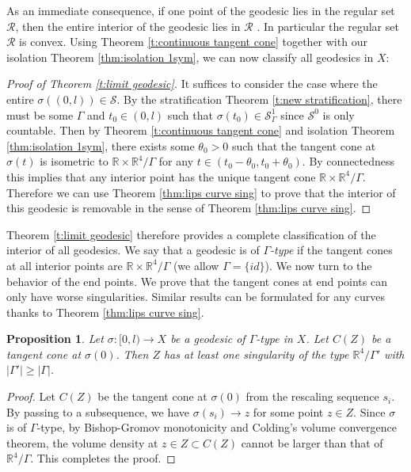 \documentclass[11pt,reqno]{amsart}
\numberwithin{equation}{section}
\newcommand{\RR}{\mathds{R}}
\newcommand{\cR}{\mathcal{R}}
\newcommand{\cS}{\mathcal{S}}
\newtheorem{proposition}[thm]{Proposition}
\theoremstyle{definition}
\theoremstyle{remark}
\begin{document}
As an immediate consequence, if one point of the geodesic lies in the regular set $\cR$, then the entire interior of the geodesic lies in $\cR$ \cite{con12}. In particular the regular set $\cR$ is convex. Using Theorem \ref{t:continuous tangent cone} together with our isolation Theorem \ref{thm:isolation 1sym}, we can now classify all geodesics in $X$: 

\begin{proof}[Proof of Theorem \ref{t:limit geodesic}]
    It suffices to consider the case where the entire $\sigma((0,l)) \in \cS$. By the stratification Theorem \ref{t:new stratification}, there must be some $\Gamma$ and $t_0 \in (0,l)$ such that $\sigma(t_0) \in \cS^1_{\Gamma}$ since $\cS^0$ is only countable. Then by Theorem \ref{t:continuous tangent cone} and isolation Theorem \ref{thm:isolation 1sym}, there exists some $\theta_0>0$ such that the tangent cone at $\sigma(t)$ is isometric to $\RR \times \RR^4/\Gamma$ for any $t\in (t_0-\theta_0, t_0 + \theta_0)$. By connectedness this implies that any interior point has the unique tangent cone $\RR \times \RR^4/\Gamma$. Therefore we can use Theorem \ref{thm:lips curve sing} to prove that the interior of this geodesic is removable in the sense of Theorem \ref{thm:lips curve sing}.    
\end{proof}

Theorem \ref{t:limit geodesic} therefore provides a complete classification of the interior of all geodesics. We say that a geodesic is of \emph{$\Gamma$-type} if the tangent cones at all interior points are $\RR \times \RR^4/\Gamma$ (we allow $\Gamma = \{id\}$). We now turn to the behavior of the end points. We prove that the tangent cones at end points can only have worse singularities. Similar results can be formulated for any curves thanks to Theorem \ref{thm:lips curve sing}.

\begin{proposition}
    Let $\sigma:[0,l) \to X$ be a geodesic of $\Gamma$-type in $X$. Let $C(Z)$ be a tangent cone at $\sigma(0)$. Then $Z$ has at least one singularity of the type $\RR^4/\Gamma'$ with $|\Gamma'|\ge |\Gamma|$.
\end{proposition}

\begin{proof}
    Let $C(Z)$ be the tangent cone at $\sigma(0)$ from the rescaling sequence $s_i$. By passing to a subsequence, we have $\sigma(s_i) \to z$ for some point $z \in Z$. Since $\sigma$ is of $\Gamma$-type, by Bishop-Gromov monotonicity and Colding's volume convergence theorem, the volume density at $z \in Z\subset C(Z)$ cannot be larger than that of $\RR^4/\Gamma$. This completes the proof.
\end{proof}
\end{document}

